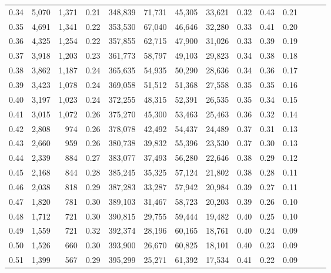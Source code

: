 \begin{tabular}{rrrrrrrrrrrrrr}
0.34 &   5,070 &  1,371 &  0.21 &  348,839 &   71,731 &  45,305 &  33,621 &  0.32 &  0.43 &      0.21 \\
0.35 &   4,691 &  1,341 &  0.22 &  353,530 &   67,040 &  46,646 &  32,280 &  0.33 &  0.41 &      0.20 \\
0.36 &   4,325 &  1,254 &  0.22 &  357,855 &   62,715 &  47,900 &  31,026 &  0.33 &  0.39 &      0.19 \\
0.37 &   3,918 &  1,203 &  0.23 &  361,773 &   58,797 &  49,103 &  29,823 &  0.34 &  0.38 &      0.18 \\
0.38 &   3,862 &  1,187 &  0.24 &  365,635 &   54,935 &  50,290 &  28,636 &  0.34 &  0.36 &      0.17 \\
0.39 &   3,423 &  1,078 &  0.24 &  369,058 &   51,512 &  51,368 &  27,558 &  0.35 &  0.35 &      0.16 \\
0.40 &   3,197 &  1,023 &  0.24 &  372,255 &   48,315 &  52,391 &  26,535 &  0.35 &  0.34 &      0.15 \\
0.41 &   3,015 &  1,072 &  0.26 &  375,270 &   45,300 &  53,463 &  25,463 &  0.36 &  0.32 &      0.14 \\
0.42 &   2,808 &    974 &  0.26 &  378,078 &   42,492 &  54,437 &  24,489 &  0.37 &  0.31 &      0.13 \\
0.43 &   2,660 &    959 &  0.26 &  380,738 &   39,832 &  55,396 &  23,530 &  0.37 &  0.30 &      0.13 \\
0.44 &   2,339 &    884 &  0.27 &  383,077 &   37,493 &  56,280 &  22,646 &  0.38 &  0.29 &      0.12 \\
0.45 &   2,168 &    844 &  0.28 &  385,245 &   35,325 &  57,124 &  21,802 &  0.38 &  0.28 &      0.11 \\
0.46 &   2,038 &    818 &  0.29 &  387,283 &   33,287 &  57,942 &  20,984 &  0.39 &  0.27 &      0.11 \\
0.47 &   1,820 &    781 &  0.30 &  389,103 &   31,467 &  58,723 &  20,203 &  0.39 &  0.26 &      0.10 \\
0.48 &   1,712 &    721 &  0.30 &  390,815 &   29,755 &  59,444 &  19,482 &  0.40 &  0.25 &      0.10 \\
0.49 &   1,559 &    721 &  0.32 &  392,374 &   28,196 &  60,165 &  18,761 &  0.40 &  0.24 &      0.09 \\
0.50 &   1,526 &    660 &  0.30 &  393,900 &   26,670 &  60,825 &  18,101 &  0.40 &  0.23 &      0.09 \\
0.51 &   1,399 &    567 &  0.29 &  395,299 &   25,271 &  61,392 &  17,534 &  0.41 &  0.22 &      0.09 \\

\end{tabular}
